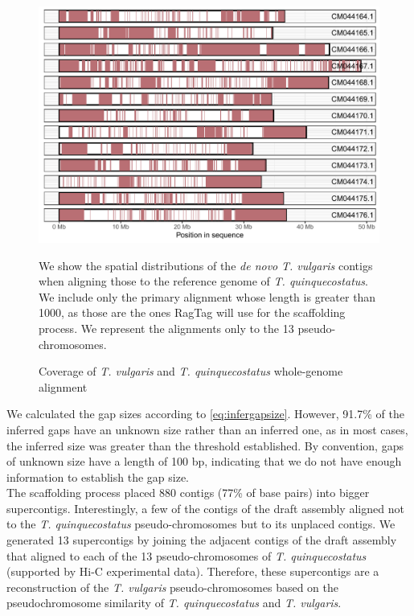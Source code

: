\begin{figure}
    \begin{center}
        \includegraphics[width=\textwidth]{gfx/coverage_long_reads_tq.pdf}
        \caption{Coverage of \textit{T. vulgaris} and \textit{T. quinquecostatus} whole-genome alignment}   
        \label{fig:coverage_long_reads}
 
    \end{center}
        \footnotesize
    We show the spatial distributions of the \textit{de novo} \textit{T. vulgaris} contigs when aligning those to the reference genome of   \textit{T. quinquecostatus}. We include only the primary alignment whose length is greater than 1000, as those are the ones RagTag will use for the scaffolding process. We represent the alignments only to the 13 pseudo-chromosomes.  
\end{figure}   

We calculated the gap sizes according to \eqref{eq:infergapsize}. However, 91.7\% of the inferred gaps have an unknown size rather than an inferred one, as in most cases, the inferred size was greater than the threshold established. By convention, gaps of unknown size have a  length of 100 bp, indicating that we do not have enough information to establish the gap size.\cite{AGPSpecificationV2}\\

The scaffolding process placed 880 contigs (77\% of base pairs) into bigger supercontigs.  Interestingly, a few of the contigs of the draft assembly aligned not to the \textit{T. quinquecostatus} pseudo-chromosomes but to its unplaced contigs. We generated 13 supercontigs by joining the adjacent contigs of the draft assembly that aligned to each of the 13 pseudo-chromosomes of \textit{T. quinquecostatus} (supported by \ac{Hi-C} experimental data). Therefore,  these supercontigs are a reconstruction of the \textit{T. vulgaris} pseudo-chromosomes based on the pseudochromosome similarity of \textit{T. quinquecostatus} and \textit{T. vulgaris}.\\

